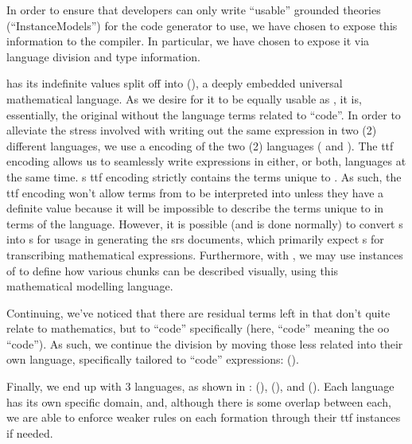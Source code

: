 In order to ensure that developers can only write ``usable'' grounded theories
(``InstanceModels'') for the code generator to use, we have chosen to expose
this information to the compiler. In particular, we have chosen to expose it via
language division and type information.

\languageDivision{}

\Expr{} has its indefinite values split off into \ModelExpr{}
(), a deeply embedded universal mathematical
language. As we desire for it to be equally usable as \Expr{}, it is,
essentially, the original \Expr{} without the language terms related to
``code''. In order to alleviate the stress involved with
writing out the same expression in two (2) different languages, we use a
 encoding of the two (2) languages ( and
). The \acs{ttf} encoding allows us to
seamlessly write expressions in either, or both, languages at the same time.
\ModelExpr{}s \acs{ttf} encoding strictly contains the terms unique to
\ModelExpr{}. As such, the \acs{ttf} encoding won't allow terms from
\ModelExpr{} to be interpreted into \Expr{} unless they have a definite value
because it will be impossible to describe the terms unique to \ModelExpr{} in
terms of the \Expr{} language. However, it is possible (and is done normally) to
convert \Expr{}s into \ModelExpr{}s for usage in generating the \acs{srs}
documents, which primarily expect \ModelExpr{}s for transcribing mathematical
expressions. Furthermore, with \ModelExpr{}, we may use instances of  to define how various chunks can be described
visually, using this mathematical modelling language.

Continuing, we've noticed that there are residual terms left in \Expr{} that
don't quite relate to mathematics, but to ``code'' specifically (here, ``code''
meaning the \acs{oo} ``code''). As such, we continue the division by moving
those less related into their own language, specifically tailored to ``code''
expressions: \CodeExpr{} ().

Finally, we end up with 3 languages, as shown in : \Expr{}
(), \ModelExpr{} (), and
\CodeExpr{} (). Each language has its own
specific domain, and, although there is some overlap between each, we are able
to enforce weaker rules on each formation through their \acs{ttf} instances if
needed.

